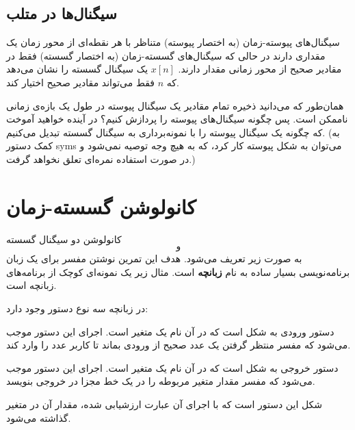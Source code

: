 \documentclass{utsignal}
\begin{document}
	\subsection{سیگنال‌ها در متلب}
	سیگنال‌های پیوسته-زمان  (به اختصار پیوسته) متناظر با هر نقطه‌ای از محور زمان یک مقداری دارند در حالی که سیگنال‌‌های گسسته-زمان (به اختصار گسسته) فقط در مقادیر صحیح از محور زمانی مقدار دارند. $x[n]$ یک سیگنال گسسته را نشان می‌دهد که $n$ فقط می‌تواند مقادیر صحیح اختیار کند.
	
	همان‌طور که می‌دانید ذخیره تمام مقادیر یک سیگنال پیوسته در طول یک بازه‌ی زمانی ناممکن است. پس چگونه سیگنال‌های پیوسته را پردازش کنیم؟ در آینده خواهید آموخت که چگونه یک سیگنال پیوسته را با نمونه‌برداری به سیگنال گسسته تبدیل می‌کنیم. (به کمک دستور syms می‌توان به شکل پیوسته کار کرد، که به هیچ وجه توصیه نمی‌شود و در صورت استفاده نمره‌ای تعلق نخواهد گرفت.)
	\section{کانولوشن گسسته-زمان}
	کانولوشن دو سیگنال گسسته $$ و $$ به صورت زیر تعریف می‌شود.
    هدف این تمرین نوشتن مفسر برای یک زبان برنامه‌نویسی بسیار ساده به نام \textbf{زبانچه} است. مثال زیر یک نمونه‌ای کوچک از برنامه‌های زبانچه است.

    \begin{latin}
%    
    \end{latin}
    
    \begin{latin}
    \end{latin}

    در زبانچه سه نوع دستور وجود دارد:

    \begin{description}[leftmargin=6em,style=nextline,font=\labelitemi\quad\bfseries]
    \item[ورودی]
    دستور ورودی به شکل  است که در آن  نام یک متغیر است. اجرای این دستور موجب می‌شود که مفسر منتظر گرفتن یک عدد صحیح از ورودی بماند تا کاربر عدد را وارد کند.
    \item[خروجی]
    دستور خروجی به شکل  است که در آن  نام یک متغیر است. اجرای این دستور موجب می‌شود که مفسر مقدار متغیر مربوطه را در یک خط مجزا در خروجی بنویسد.
    \item[جایگزینی]
    شکل این دستور  است که با اجرای آن عبارت  ارزشیابی شده، مقدار آن در متغیر  گذاشته می‌شود.
    \end{description}
\end{document}
